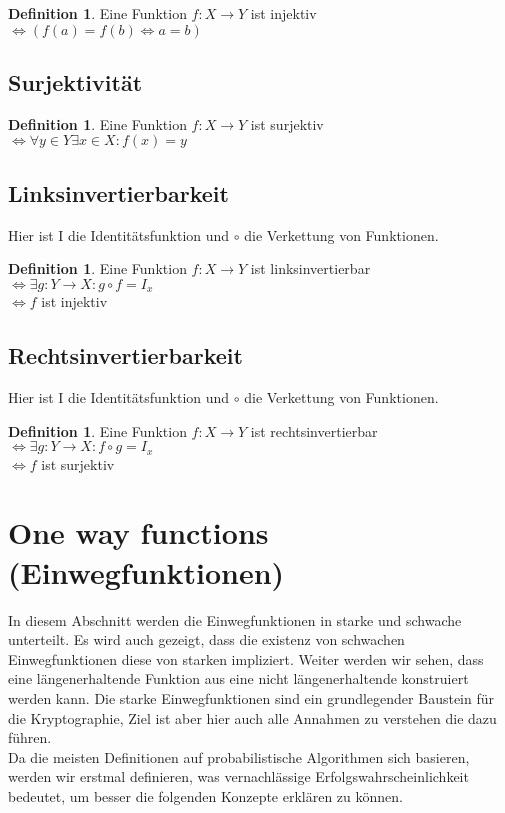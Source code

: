 \documentclass[12pt,a4paper]{article}
\theoremstyle{definition}
\newtheorem{definition}[theorem]{Definition}
\begin{document}
    \begin{definition}
        Eine Funktion $f: X \longrightarrow Y$ ist injektiv \\
        $\Leftrightarrow (f(a) = f(b) \Leftrightarrow a = b)$
    \end{definition}

    \subsection{Surjektivität}

    \begin{definition}
        Eine Funktion $f: X \longrightarrow Y$ ist surjektiv \\
        $\Leftrightarrow \forall y \in Y \exists x \in X: f(x) = y$
    \end{definition}

    \subsection{Linksinvertierbarkeit}
    Hier ist I die Identitätsfunktion und $\circ$ die Verkettung von Funktionen.
    \begin{definition}
        Eine Funktion $f: X \longrightarrow Y$ ist linksinvertierbar \\
        $\Leftrightarrow \exists g: Y \longrightarrow X: g \circ f = I_x$ \\
        $\Leftrightarrow f$ ist injektiv
    \end{definition}

    \subsection{Rechtsinvertierbarkeit}
    Hier ist I die Identitätsfunktion und $\circ$ die Verkettung von Funktionen.
    \begin{definition}
        Eine Funktion $f: X \longrightarrow Y$ ist rechtsinvertierbar \\
        $\Leftrightarrow \exists g: Y \longrightarrow X: f \circ g = I_x$ \\
        $\Leftrightarrow f$ ist surjektiv
    \end{definition}


    \section{One way functions (Einwegfunktionen)}

    In diesem Abschnitt werden die Einwegfunktionen in starke und schwache unterteilt. Es wird auch gezeigt, dass die
    existenz von schwachen Einwegfunktionen diese von starken impliziert. Weiter werden wir sehen, dass eine
    längenerhaltende Funktion aus eine nicht längenerhaltende konstruiert werden kann. Die starke Einwegfunktionen
    sind ein grundlegender Baustein für die Kryptographie, Ziel ist aber hier auch alle Annahmen zu verstehen die dazu
    führen. \\
    Da die meisten Definitionen auf probabilistische Algorithmen sich basieren, werden wir erstmal definieren, was
    vernachlässige Erfolgswahrscheinlichkeit bedeutet, um besser die folgenden Konzepte erklären zu können.
\end{document}

